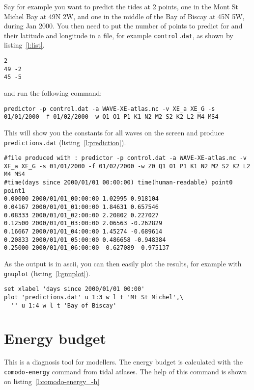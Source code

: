 \documentclass[11pt]{article} %
\providecommand{\code}[1]{\hbox{\lstinline|#1|}}
\providecommand{\cmdhelp}[1]{\end{multicols}\begin{multicols}{2}}
\newcommand{\lref}[1]{listing~\ref{#1}}
\begin{document}
\begin{multicols}{2}
Say for example you want to predict the tides at 2 points, one in the Mont St Michel Bay at 49N 2W, and one in the middle of the Bay of Biscay at 45N 5W, during Jan 2000.
You then need to put the number of points to predict for and their latitude and longitude in a file, for example \code{control.dat}, as shown by \lref{l:list}.
\begin{lstlisting}[caption=example list of control points,label=l:list]
2
49 -2
45 -5
\end{lstlisting}
and run the following command:
\begin{lstlisting}
predictor -p control.dat -a WAVE-XE-atlas.nc -v XE_a XE_G -s 01/01/2000 -f 01/02/2000 -w Q1 O1 P1 K1 N2 M2 S2 K2 L2 M4 MS4
\end{lstlisting}
This will show you the constants for all waves on the screen
  and produce \code{predictions.dat} (\lref{l:prediction}).
\begin{lstlisting}[caption=first few line of \code{predictions.dat},label=l:prediction]
#file produced with : predictor -p control.dat -a WAVE-XE-atlas.nc -v XE_a XE_G -s 01/01/2000 -f 01/02/2000 -w Z0 Q1 O1 P1 K1 N2 M2 S2 K2 L2 M4 MS4
#time(days since 2000/01/01 00:00:00) time(human-readable) point0 point1
0.00000 2000/01/01_00:00:00 1.02995 0.918104
0.04167 2000/01/01_01:00:00 1.84631 0.657546
0.08333 2000/01/01_02:00:00 2.20802 0.227027
0.12500 2000/01/01_03:00:00 2.06563 -0.262829
0.16667 2000/01/01_04:00:00 1.45274 -0.689614
0.20833 2000/01/01_05:00:00 0.486658 -0.948384
0.25000 2000/01/01_06:00:00 -0.627089 -0.975137
\end{lstlisting}
As the output is in ascii, you can then easily plot the results, for example with \code{gnuplot} (\lref{l:gnuplot}).
\begin{lstlisting}[caption=\code{gnuplot} commands for \code{predictions.dat},label=l:gnuplot]
set xlabel 'days since 2000/01/01 00:00'
plot 'predictions.dat' u 1:3 w l t 'Mt St Michel',\
  '' u 1:4 w l t 'Bay of Biscay'
\end{lstlisting}

\section{Energy budget}

This is a diagnosis tool for modellers.
The energy budget is calculated with the \code{comodo-energy} command from tidal atlases.
The help of this command is shown on \lref{l:comodo-energy_-h}
\cmdhelp{comodo-energy}


\end{multicols}
\end{document}

